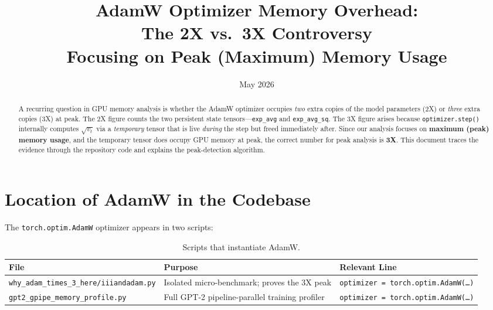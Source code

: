 \documentclass[11pt,a4paper]{article}
\title{AdamW Optimizer Memory Overhead: \\
       The 2X vs.\ 3X Controversy \\[0.5em]
       \large Focusing on Peak (Maximum) Memory Usage}
\author{}
\date{May 2026}
\begin{document}
\maketitle

\begin{abstract}
A recurring question in GPU memory analysis is whether the AdamW optimizer
occupies \emph{two} extra copies of the model parameters (2X) or
\emph{three} extra copies (3X) at peak.  The 2X figure counts the two
persistent state tensors---\texttt{exp\_avg} and \texttt{exp\_avg\_sq}.
The 3X figure arises because \texttt{optimizer.step()} internally computes
$\sqrt{v_t}$ via a \emph{temporary} tensor that is live \emph{during} the
step but freed immediately after.  Since our analysis focuses on
\textbf{maximum (peak) memory usage}, and the temporary tensor does occupy
GPU memory at peak, the correct number for peak analysis is \textbf{3X}.
This document traces the evidence through the repository code and explains
the peak-detection algorithm.
\end{abstract}

\tableofcontents
\newpage

\section{Location of AdamW in the Codebase}
\label{sec:location}

The \texttt{torch.optim.AdamW} optimizer appears in two scripts:

\begin{table}[h]
\centering
\caption{Scripts that instantiate AdamW.}
\label{tab:scripts}
\begin{tabular}{lll}
\toprule
\textbf{File} & \textbf{Purpose} & \textbf{Relevant Line} \\
\midrule
\texttt{why\_adam\_times\_3\_here/iiiandadam.py}
  & Isolated micro-benchmark; proves the 3X peak
  & \texttt{optimizer = torch.optim.AdamW(\ldots)} \\
\texttt{gpt2\_gpipe\_memory\_profile.py}
  & Full GPT-2 pipeline-parallel training profiler
  & \texttt{optimizer = torch.optim.AdamW(\ldots)} \\
\bottomrule
\end{tabular}
\end{table}
\end{document}

